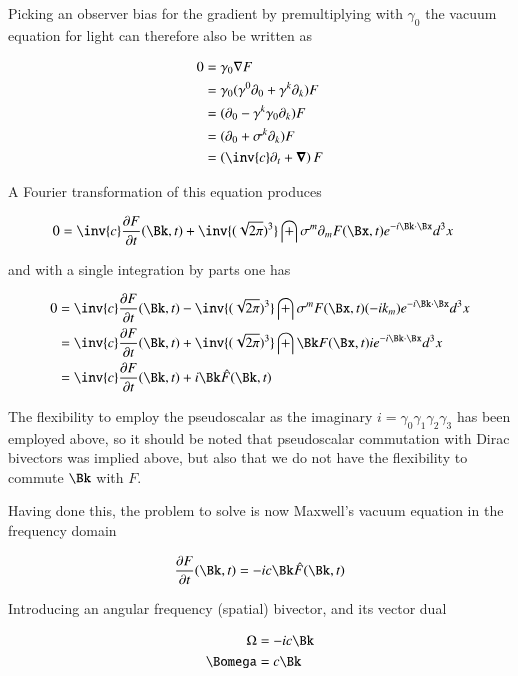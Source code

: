 Picking an observer bias for the gradient by premultiplying with $\gamma_0$ the vacuum equation for light can therefore also be written as

\begin{align*}
0
&= \gamma_0 \grad F \\
&= \gamma_0 (\gamma^0 \partial_0 + \gamma^k \partial_k) F \\
&= (\partial_0 - \gamma^k \gamma_0 \partial_k) F \\
&= (\partial_0 + \sigma^k \partial_k) F \\
&= \left(\inv{c}\partial_t + \spacegrad \right) F \\
\end{align*}

A Fourier transformation of this equation produces

\begin{align*}
0 &= \inv{c} \frac{\partial F}{\partial t}(\Bk,t) + \inv{(\sqrt{2\pi})^3} \int \sigma^m \partial_m F(\Bx,t) e^{-i \Bk \cdot \Bx} d^3 x
\end{align*}

and with a single integration by parts one has

\begin{align*}
0
&= \inv{c} \frac{\partial F}{\partial t}(\Bk,t) - \inv{(\sqrt{2\pi})^3} \int \sigma^m F(\Bx,t) (-i k_m) e^{-i \Bk \cdot \Bx} d^3 x \\
&= \inv{c} \frac{\partial F}{\partial t}(\Bk,t) + \inv{(\sqrt{2\pi})^3} \int \Bk F(\Bx,t) i e^{-i \Bk \cdot \Bx} d^3 x \\
&= \inv{c} \frac{\partial F}{\partial t}(\Bk,t) + i \Bk \hat{F}(\Bk,t)
\end{align*}

The flexibility to employ the pseudoscalar as the imaginary $i = \gamma_0 \gamma_1 \gamma_2 \gamma_3$ has been employed above, so it should be noted that pseudoscalar commutation with Dirac bivectors was implied above, but also that we do not have the flexibility to commute $\Bk$ with $F$.

Having done this, the problem to solve is now Maxwell's vacuum equation in the frequency domain

\begin{align*}
\frac{\partial F}{\partial t}(\Bk,t) = -i c \Bk \hat{F}(\Bk,t)
\end{align*}

Introducing an angular frequency (spatial) bivector, and its vector dual

\begin{align}
\Omega &= -i c \Bk \\
\Bomega &= c \Bk
\end{align}

